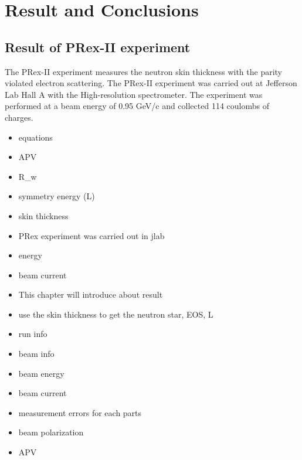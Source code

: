 \chapter{Result and Conclusions}

\section{Result of PRex-II experiment}

The PRex-II experiment measures the neutron skin thickness with the parity violated electron scattering. The PRex-II experiment was carried out at Jefferson Lab Hall A with the High-resolution spectrometer. The experiment was performed at a beam energy of 0.95 GeV/c and collected 114 coulombs of charges. 



\begin{itemize}
    \item equations
    \item APV
    \item R_w
    \item symmetry energy (L)
    \item skin thickness 
\end{itemize}


\begin{itemize}
    \item PRex experiment was carried out in jlab 
    \item energy 
    \item  beam current 
    \item  This chapter will introduce about result 
    \item use the skin thickness to get the neutron star, EOS, L 
\end{itemize}

\begin{itemize}
    \item run info
    \item beam info
    \item beam energy 
    \item beam current 
\end{itemize}


\begin{itemize}
    \item measurement errors for each parts
    \item beam polarization 
    \item APV
\end{itemize}

